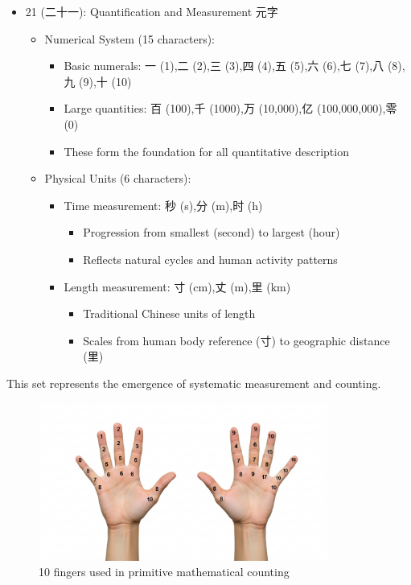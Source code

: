 \documentclass[
  11pt,
  letterpaper,
]{article}
\providecommand{\tightlist}{%
  \setlength{\itemsep}{0pt}\setlength{\parskip}{0pt}}
\begin{document}
\begin{itemize}
\tightlist
\item
  21 (二十一): Quantification and Measurement 元字

  \begin{itemize}
  \tightlist
  \item
    Numerical System (15 characters):

    \begin{itemize}
    \tightlist
    \item
      Basic numerals: 一 (1),二 (2),三 (3),四 (4),五 (5),六 (6),七
      (7),八 (8),九 (9),十 (10)
    \item
      Large quantities: 百 (100),千 (1000),万 (10,000),亿
      (100,000,000),零 (0)
    \item
      These form the foundation for all quantitative description
    \end{itemize}
  \item
    Physical Units (6 characters):

    \begin{itemize}
    \tightlist
    \item
      Time measurement: 秒 (s),分 (m),时 (h)

      \begin{itemize}
      \tightlist
      \item
        Progression from smallest (second) to largest (hour)
      \item
        Reflects natural cycles and human activity patterns
      \end{itemize}
    \item
      Length measurement: 寸 (cm),丈 (m),里 (km)

      \begin{itemize}
      \tightlist
      \item
        Traditional Chinese units of length
      \item
        Scales from human body reference (寸) to geographic distance
        (里)
      \end{itemize}
    \end{itemize}
  \end{itemize}
\end{itemize}

This set represents the emergence of systematic measurement and
counting.

\begin{figure}
\centering
\includegraphics[width=0.85\textwidth]{./images/10-fingers.jpg}
\caption{10 fingers used in primitive mathematical counting}
\end{figure}
\end{document}
